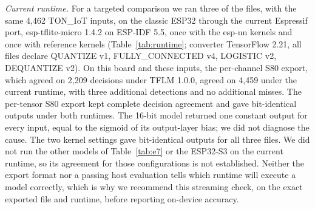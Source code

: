 \documentclass[sigplan,10pt,review,anonymous,nonacm]{acmart}
\newcommand{\ton}{TON\_IoT\xspace}
\begin{document}
\emph{Current runtime.} For a targeted comparison we ran three of the files, with the same 4,462 \ton
inputs, on the classic ESP32 through the current Espressif port, esp-tflite-micro 1.4.2 on ESP-IDF 5.5,
once with the esp-nn kernels and once with reference kernels (Table~\ref{tab:runtime}; converter
TensorFlow 2.21, all files declare QUANTIZE v1, FULLY\_CONNECTED v4, LOGISTIC v2, DEQUANTIZE v2). On
this board and these inputs, the per-channel S80 export, which agreed on 2,209 decisions under TFLM
1.0.0, agreed on 4,459 under the current runtime, with three additional detections and no additional
misses. The per-tensor S80 export kept complete decision agreement and gave bit-identical outputs under
both runtimes. The 16-bit model returned one constant output for every input, equal to the sigmoid of
its output-layer bias; we did not diagnose the cause. The two kernel settings gave bit-identical outputs
for all three files. We did not run the other models of Table~\ref{tab:e7} or the ESP32-S3 on the current
runtime, so its agreement for those configurations is not established. Neither the export format nor a
passing host evaluation tells which runtime will execute a model correctly, which is why we recommend
this streaming check, on the exact exported file and runtime, before reporting on-device accuracy.
\end{document}
